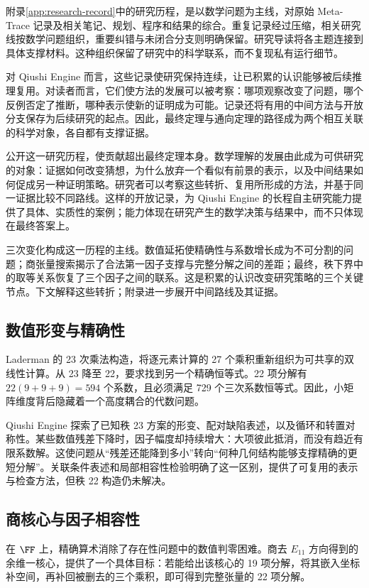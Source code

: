 附录\ref{app:research-record}中的研究历程，是以数学问题为主线，对原始 Meta-Trace 记录及相关笔记、规划、程序和结果的综合。重复记录经过压缩，相关研究线按数学问题组织，重要纠错与未闭合分支则明确保留。研究导读将各主题连接到具体支撑材料。这种组织保留了研究中的科学联系，而不复现私有运行细节。

对 Qiushi Engine 而言，这些记录使研究保持连续，让已积累的认识能够被后续推理复用。对读者而言，它们使方法的发展可以被考察：哪项观察改变了问题，哪个反例否定了推断，哪种表示使新的证明成为可能。记录还将有用的中间方法与开放分支保存为后续研究的起点。因此，最终定理与通向定理的路径成为两个相互关联的科学对象，各自都有支撑证据。

公开这一研究历程，使贡献超出最终定理本身。数学理解的发展由此成为可供研究的对象：证据如何改变猜想，为什么放弃一个看似有前景的表示，以及中间结果如何促成另一种证明策略。研究者可以考察这些转折、复用所形成的方法，并基于同一证据比较不同路线。这样的开放记录，为 Qiushi Engine 的长程自主研究能力提供了具体、实质性的案例；能力体现在研究产生的数学决策与结果中，而不只体现在最终答案上。

三次变化构成这一历程的主线。数值延拓使精确性与系数增长成为不可分割的问题；商张量搜索揭示了合法第一因子支撑与完整分解之间的差距；最终，秩下界中的取等关系恢复了三个因子之间的联系。这是积累的认识改变研究策略的三个关键节点。下文解释这些转折；附录进一步展开中间路线及其证据。

\subsection{数值形变与精确性}

Laderman 的 23 次乘法构造，将逐元素计算的 27 个乘积重新组织为可共享的双线性计算\cite{laderman1976noncommutative}。从 23 降至 22，要求找到另一个精确恒等式。22 项分解有 $22(9+9+9)=594$ 个系数，且必须满足 729 个三次系数恒等式。因此，小矩阵维度背后隐藏着一个高度耦合的代数问题。

Qiushi Engine 探索了已知秩 23 方案的形变、配对缺陷表述，以及循环和转置对称性。某些数值残差下降时，因子幅度却持续增大：大项彼此抵消，而没有趋近有限系数解。这使问题从“残差还能降到多小”转向“何种几何结构能够支撑精确的更短分解”。关联条件表述和局部相容性检验明确了这一区别，提供了可复用的表示与检查方法，但秩 22 构造仍未解决。

\subsection{商核心与因子相容性}

在 $\FF$ 上，精确算术消除了存在性问题中的数值判零困难。商去 $E_{11}$ 方向得到的余维一核心，提供了一个具体目标：若能给出该核心的 19 项分解，将其嵌入坐标补空间，再补回被删去的三个乘积，即可得到完整张量的 22 项分解。

